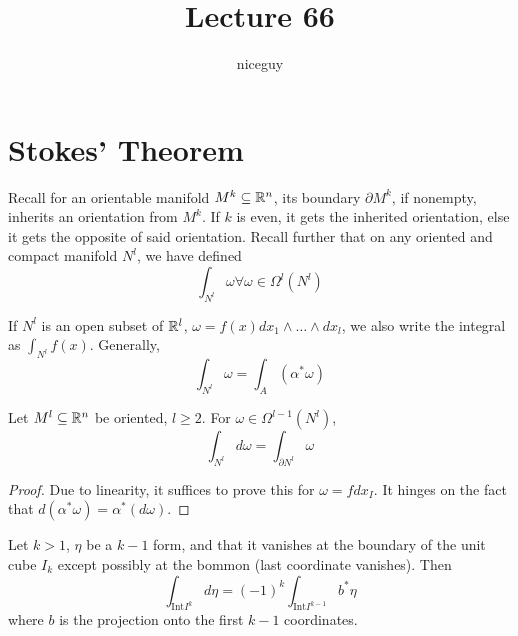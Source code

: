 \documentclass[12pt]{article}
\title{Lecture 66}
\author{niceguy}
\begin{document}
\maketitle

\section{Stokes' Theorem}

Recall for an orientable manifold $M^k \subseteq \mathbb{R}^n$, its boundary $\partial M^k$, if nonempty, inherits an orientation from $M^k$. If $k$ is even, it gets the inherited orientation, else it gets the opposite of said orientation. Recall further that on any oriented and compact manifold $N^l$, we have defined
$$\int_{N^l}\omega \forall \omega \in \Omega^l(N^l)$$

If $N^l$ is an open subset of $\mathbb{R}^l$, $\omega = f(x) dx_1 \wedge \dots \wedge dx_l$, we also write the integral as $\int_{N^l}f(x)$. Generally,
$$\int_{N^l}\omega = \int_A(\alpha^*\omega)$$

\begin{thm}
    Let $M^l \subseteq \mathbb{R}^n$ be oriented, $l \ge 2$. For $\omega \in \Omega^{l-1}(N^l)$,
    $$\int_{N^l}d\omega = \int_{\partial N^l} \omega$$
\end{thm}

\begin{proof}
    Due to linearity, it suffices to prove this for $\omega = fdx_I$. It hinges on the fact that $d(\alpha^*\omega) = \alpha^*(d\omega)$.
\end{proof}

\begin{lem}
    Let $k > 1$, $\eta$ be a $k-1$ form, and that it vanishes at the boundary of the unit cube $I_k$ except possibly at the bommon (last coordinate vanishes). Then
    $$\int_{\text{Int}I^k} d\eta = (-1)^k\int_{\text{Int}I^{k-1}}b^*\eta$$
    where $b$ is the projection onto the first $k-1$ coordinates.
\end{lem}
\end{document}
